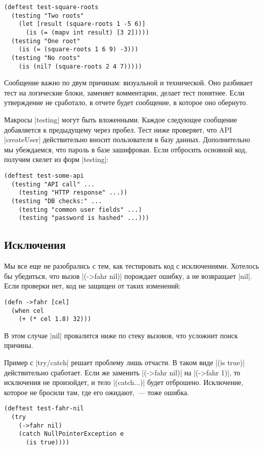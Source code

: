 \begin{verbatim}
(deftest test-square-roots
  (testing "Two roots"
    (let [result (square-roots 1 -5 6)]
      (is (= (mapv int result) [3 2]))))
  (testing "One root"
    (is (= (square-roots 1 6 9) -3)))
  (testing "No roots"
    (is (nil? (square-roots 2 4 7)))))
\end{verbatim}

Сообщение важно по двум причинам: визуальной и технической. Оно разбивает тест
на логические блоки, заменяет комментарии, делает тест понятнее. Если
утверждение не сработало, в отчете будет сообщение, в которое оно обернуто.

Макросы \spverb|testing| могут быть вложенными. Каждое следующее сообщение
добавляется к предыдущему через пробел. Тест ниже проверяет, что API
\spverb|createUser| действительно вносит пользователя в базу
данных. Дополнительно мы убеждаемся, что пароль в базе зашифрован. Если
отбросить основной код, получим скелет из форм \spverb|testing|:

\begin{verbatim}
(deftest test-some-api
  (testing "API call" ...
    (testing "HTTP response" ...))
  (testing "DB checks:" ...
    (testing "common user fields" ...)
    (testing "password is hashed" ...)))
\end{verbatim}

\subsection{Исключения}

Мы все еще не разобрались с тем, как тестировать код с исключениями. Хотелось бы
убедиться, что вызов \spverb|(->fahr nil)| порождает ошибку, а не возвращает
\spverb|nil|. Если проверки нет, код не защищен от таких изменений:

\begin{verbatim}
(defn ->fahr [cel]
  (when cel
    (+ (* cel 1.8) 32)))
\end{verbatim}

В этом случае \spverb|nil| провалится ниже по стеку вызовов, что усложнит поиск
причины.

Пример с \spverb|try/catch| решает проблему лишь отчасти. В таком виде
\spverb|(is true)| действительно сработает. Если же заменить \spverb|(->fahr nil)|
на \spverb|(->fahr 1)|, то исключения не произойдет, и тело \spverb|(catch...)|
будет отброшено. Исключение, которое не бросили там, где его ожидают,~--- тоже ошибка.

\begin{verbatim}
(deftest test-fahr-nil
  (try
    (->fahr nil)
    (catch NullPointerException e
      (is true))))
\end{verbatim}

